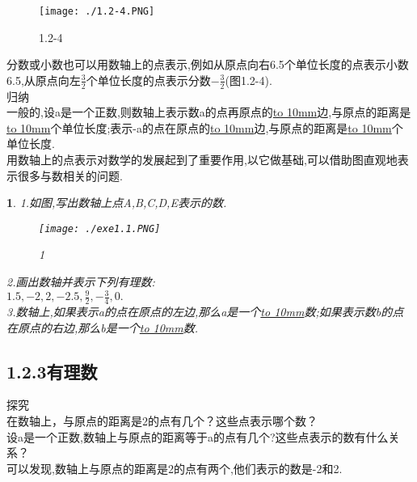 \documentclass{article}
\newtheorem{exercise}{ }
\begin{document}
	\begin{figure}[ht!]
		\centering
		\texttt{[image: ./1.2-4.PNG]}
		\caption{1.2-4}
	\end{figure}
	\indent 分数或小数也可以用数轴上的点表示,例如从原点向右6.5个单位长度的点表示小数6.5,从原点向左$\frac{3}{2}$个单位长度的点表示分数$-\frac{3}{2}$(图1.2-4).\\
	
	归纳\\
	\indent 一般的,设a是一个正数,则数轴上表示数a的点再原点的\underline{\hbox to 10mm{}}边,与原点的距离是\underline{\hbox to 10mm{}}个单位长度;表示-a的点在原点的\underline{\hbox to 10mm{}}边,与原点的距离是\underline{\hbox to 10mm{}}个单位长度.\\
	\indent 用数轴上的点表示对数学的发展起到了重要作用,以它做基础,可以借助图直观地表示很多与数相关的问题.\\
	
	\begin{exercise}
		1.如图,写出数轴上点A,B,C,D,E表示的数.\\
		\begin{figure}[ht!]
			\centering
			\texttt{[image: ./exe1.1.PNG]}
			\caption{1}
		\end{figure}
		2.画出数轴并表示下列有理数:\\
		\indent $1.5,-2,2,-2.5,\frac{9}{2},-\frac{3}{4},0.$\\
		3.数轴上,如果表示a的点在原点的左边,那么a是一个\underline{\hbox to 10mm{}}数;如果表示数b的点在原点的右边,那么b是一个\underline{\hbox to 10mm{}}数.\\
	\end{exercise}

	\subsection*{1.2.3有理数}
	探究\\
	\indent 在数轴上，与原点的距离是2的点有几个？这些点表示哪个数？\\
	设a是一个正数,数轴上与原点的距离等于a的点有几个?这些点表示的数有什么关系？\\
	\indent 可以发现,数轴上与原点的距离是2的点有两个,他们表示的数是-2和2.\\
	
\end{document}
